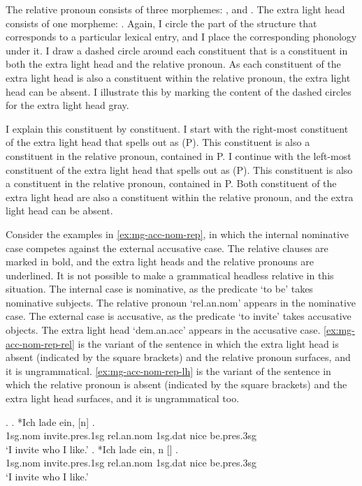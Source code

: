 The relative pronoun consists of three morphemes: ,  and .
The extra light head consists of one morpheme: .
Again, I circle the part of the structure that corresponds to a particular lexical entry, and I place the corresponding phonology under it.
I draw a dashed circle around each constituent that is a constituent in both the extra light head and the relative pronoun.
As each constituent of the extra light head is also a constituent within the relative pronoun, the extra light head can be absent. I illustrate this by marking the content of the dashed circles for the extra light head gray.

I explain this constituent by constituent.
I start with the right-most constituent of the extra light head that spells out as  (P). This constituent is also a constituent in the relative pronoun, contained in P.
I continue with the left-most constituent of the extra light head that spells out as  (P). This constituent is also a constituent in the relative pronoun, contained in P.
Both constituent of the extra light head are also a constituent within the relative pronoun, and the extra light head can be absent.

Consider the examples in \ref{ex:mg-acc-nom-rep}, in which the internal nominative case competes against the external accusative case. The relative clauses are marked in bold, and the extra light heads and the relative pronouns are underlined. It is not possible to make a grammatical headless relative in this situation.
The internal case is nominative, as the predicate  `to be' takes nominative subjects. The relative pronoun  `\ac{rel}.\ac{an}.\ac{nom}' appears in the nominative case.
The external case is accusative, as the predicate  `to invite' takes accusative objects. The extra light head  `\ac{dem}.\ac{an}.\ac{acc}' appears in the accusative case.
\ref{ex:mg-acc-nom-rep-rel} is the variant of the sentence in which the extra light head is absent (indicated by the square brackets) and the relative pronoun surfaces, and it is ungrammatical.
\ref{ex:mg-acc-nom-rep-lh} is the variant of the sentence in which the relative pronoun is absent (indicated by the square brackets) and the extra light head surfaces, and it is ungrammatical too.

\ex.\label{ex:mg-acc-nom-rep}
\ag. *Ich {lade ein}, [n]    .\\
1\ac{sg}.\ac{nom} invite.\ac{pres}.1\ac{sg}\scsub{[acc]} \ac{rel}.\ac{an}.\ac{nom} 1\ac{sg}.\ac{dat} nice be.\ac{pres}.3\ac{sg}\scsub{[nom]}\\
`I invite who I like.' \label{ex:mg-acc-nom-rep-rel}
\bg. *Ich {lade ein}, n []   .\\
1\ac{sg}.\ac{nom} invite.\ac{pres}.1\ac{sg}\scsub{[acc]} \ac{rel}.\ac{an}.\ac{nom} 1\ac{sg}.\ac{dat} nice be.\ac{pres}.3\ac{sg}\scsub{[nom]}\\
`I invite who I like.' \label{ex:mg-acc-nom-rep-lh}

